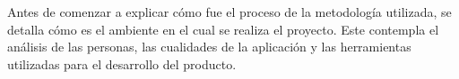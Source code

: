 Antes de comenzar a explicar cómo fue el proceso de la metodología utilizada, se detalla cómo es el ambiente en el cual se realiza el proyecto. Este contempla el análisis de las personas, las cualidades de la aplicación y las herramientas utilizadas para el desarrollo del producto.
